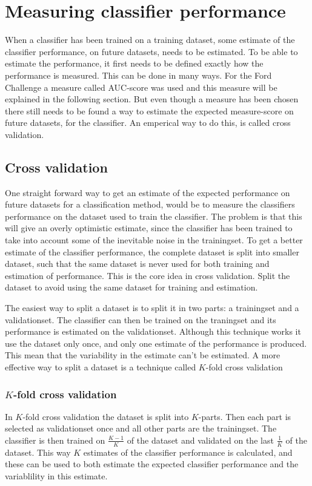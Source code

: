 \section{Measuring classifier performance}\label{sec:classifier-performance}
When a classifier has been trained on a training dataset, some estimate of the classifier performance, on future datasets, needs to be estimated. To be able to estimate the performance, it first needs to be defined exactly how the performance is measured. This can be done in many ways. For the Ford Challenge a measure called AUC-score was used and this measure will be explained in the following section. But even though a measure has been chosen there still needs to be found a way to estimate the expected measure-score on future datasets, for the classifier. An emperical way to do this, is called cross validation.

\subsection{Cross validation}
One straight forward way to get an estimate of the expected performance on future datasets for a classification method, would be to measure the classifiers performance on the dataset used to train the classifier. The problem is that this will give an overly optimistic estimate, since the classifier has been trained to take into account some of the inevitable noise in the trainingset. To get a better estimate of the classifier performance, the complete dataset is split into smaller dataset, such that the same dataset is never used for both training and estimation of performance. This is the core idea in cross validation. Split the dataset to avoid using the same dataset for training and estimation. \par
The easiest way to split a dataset is to split it in two parts: a trainingset and a validationset. The classifier can then be trained on the traningset and its performance is estimated on the validationset. Although this technique works it use the dataset only once, and only one estimate of the performance is produced. This mean that the variability in the estimate can't be estimated. A more effective way to split a dataset is a technique called $K$-fold cross validation

\subsubsection{$K$-fold cross validation}
In $K$-fold cross validation the dataset is split into $K$-parts. Then each part is selected as validationset once and all other parts are the trainingset. The classifier is then trained on $\frac{K-1}{K}$ of the dataset and validated on the last $\frac{1}{K}$ of the dataset. This way $K$ estimates of the classifier performance is calculated, and these can be used to both estimate the expected classifier performance and the variablility in this estimate.

